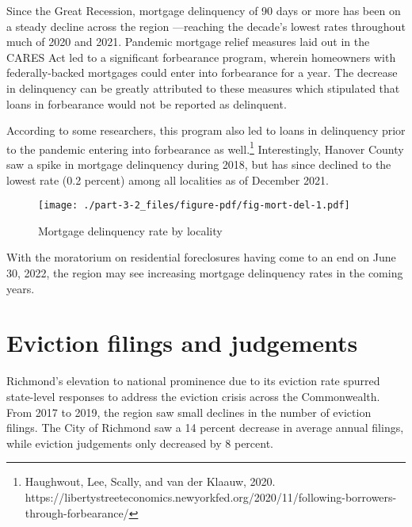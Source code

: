 \documentclass[
  letterpaper,
  DIV=11,
  numbers=noendperiod]{scrreprt}
\begin{document}
Since the Great Recession, mortgage delinquency of 90 days or more has
been on a steady decline across the region ---reaching the decade's
lowest rates throughout much of 2020 and 2021. Pandemic mortgage relief
measures laid out in the CARES Act led to a significant forbearance
program, wherein homeowners with federally-backed mortgages could enter
into forbearance for a year. The decrease in delinquency can be greatly
attributed to these measures which stipulated that loans in forbearance
would not be reported as delinquent.

According to some researchers, this program also led to loans in
delinquency prior to the pandemic entering into forbearance as
well.\footnote{Haughwout, Lee, Scally, and van der Klaauw, 2020.
  https://libertystreeteconomics.newyorkfed.org/2020/11/following-borrowers-through-forbearance/}
Interestingly, Hanover County saw a spike in mortgage delinquency during
2018, but has since declined to the lowest rate (0.2 percent) among all
localities as of December 2021.

\begin{figure}

{\centering \texttt{[image: ./part-3-2\_files/figure-pdf/fig-mort-del-1.pdf]}

}

\caption{\label{fig-mort-del}Mortgage delinquency rate by locality}

\end{figure}

With the moratorium on residential foreclosures having come to an end on
June 30, 2022, the region may see increasing mortgage delinquency rates
in the coming years.

\hypertarget{eviction-filings-and-judgements}{%
\section{Eviction filings and
judgements}\label{eviction-filings-and-judgements}}

Richmond's elevation to national prominence due to its eviction rate
spurred state-level responses to address the eviction crisis across the
Commonwealth. From 2017 to 2019, the region saw small declines in the
number of eviction filings. The City of Richmond saw a 14 percent
decrease in average annual filings, while eviction judgements only
decreased by 8 percent.
\end{document}
